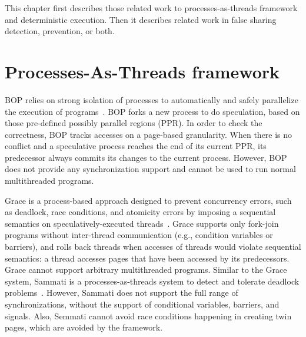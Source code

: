 
\label{chapter:relatedwork}
This chapter first describes those related work to processes-as-threads framework and deterministic execution. Then it describes related work in false sharing detection, prevention, or both. 

\section{Processes-As-Threads framework}

BOP relies on strong isolation of processes to automatically and safely parallelize the execution of programs~\cite{DingBOP}. BOP forks a new process to do speculation, based on those pre-defined possibly parallel regions (PPR). In order to check the correctness, BOP tracks accesses on a page-based granularity. When there is no conflict and a speculative process reaches the end of its current PPR, its predecessor always commits its changes to the current process. However, BOP does not provide any synchronization support and cannot be used to run normal multithreaded programs. 

Grace is a process-based approach designed to prevent
concurrency errors, such as deadlock, race conditions, and
atomicity errors by imposing a sequential semantics on
speculatively-executed threads~\cite{grace}. Grace supports only fork-join programs without inter-thread communication (e.g., condition variables or barriers), and rolls back threads when accesses of threads would violate sequential semantics: a thread accesses pages that have been accessed by its predecessors. Grace cannot support arbitrary multithreaded programs. Similar to the Grace system, Sammati is a processes-as-threads system to detect and tolerate deadlock problems~\cite{Pyla:2010:ADA:1854273.1854288}. However, Sammati does not support the full range of synchronizations, without the support of conditional variables, barriers, and signals. Also, Semmati cannot avoid race conditions happening in creating twin pages, which are avoided by the \Sheriff{} framework.

\begin{comment}
According to Revisions,  Grace cannot easily resolve all
conflicts on commit (like revisions do) and must thus restrict
tasks from producing such conflicts either statically (by type
system) or dynamically (pessimistic with blocking, or optimistic with abort and retry). Also, Grace allows only a restricted “fork-join” form of concurrency
Revisions~\ref{Burckhardt:2010:CPR:1869459.1869515}
\end{comment}

